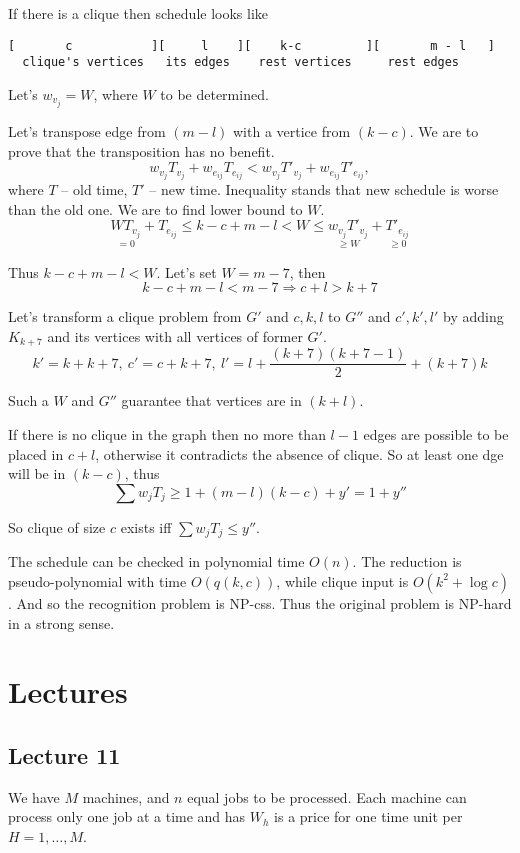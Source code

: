 \documentclass{amsart}
\begin{document}
If there is a clique then schedule looks like
\begin{verbatim}
[       c           ][     l    ][    k-c         ][       m - l   ]
  clique's vertices   its edges    rest vertices     rest edges
\end{verbatim}

Let's $w_{v_j}=W$, where $W$ to be determined.

Let's transpose edge from $(m-l)$ with a vertice from $(k-c)$.
We are to prove that the transposition has no benefit.
\[
  w_{v_j}T_{v_j} + w_{e_{ij}}T_{e_{ij}} <
    w_{v_j}T'_{v_j} + w_{e_{ij}}T'_{e_{ij}},
\]
where $T$ -- old time, $T'$ -- new time. Inequality stands that
new schedule is worse than the old one. We are to find lower bound to $W$.
\[
  \underset{=0}
    {WT_{v_j}} +
  T_{e_{ij}} \leqslant k - c + m - l <
    W \leqslant
      \underset{\geqslant W}
        { w_{v_j} T'_{v_j} } +
      \underset{\geqslant 0}
        { T'_{e_{ij}} }
\]

Thus $k-c+m-l < W$. Let's set $W=m-7$, then
\[
  k - c + m - l < m - 7 \Rightarrow c + l > k + 7
\]

Let's transform a clique problem from $G'$ and $c,k,l$ to
$G''$ and $c',k',l'$ by adding $K_{k+7}$ and its vertices with
all vertices of former $G'$.
\[
  k' = k + k + 7,\ c' = c + k + 7,
  \ l' = l + \frac{(k+7)(k+7-1)}{2} + (k+7)k
\]

Such a $W$ and $G''$ guarantee that vertices are in $(k+l)$.

If there is no clique in the graph then no more than $l-1$ edges
are possible to be placed in $c+l$, otherwise it contradicts the absence
of clique. So at least one dge will be in $(k-c)$, thus
\[
  \sum w_jT_j \geqslant 1 + (m-l)(k-c) + y' = 1 + y''
\]

So clique of size $c$ exists iff $\sum w_jT_j \leqslant y''$.

The schedule can be checked in polynomial time $O(n)$.
The reduction is pseudo-polynomial with time $O(q(k,c))$, while
clique input is $O(k^2+ \log c)$. And so the recognition problem is NP-css.
Thus the original problem is NP-hard in a strong sense.

\section{Lectures}

\subsection{Lecture 11}
We have $M$ machines, and $n$ equal jobs to be processed.
Each machine can process only one job at a time and has $W_h$ is a price
for one time unit per $H=1,\dots,M$.
\end{document}

